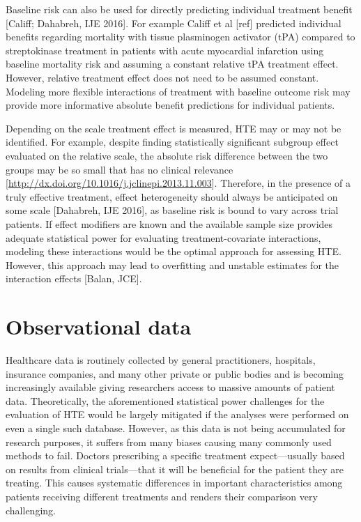 \documentclass[
]{book}
\begin{document}
Baseline risk can also be used for directly predicting individual treatment
benefit {[}Califf; Dahabreh, IJE 2016{]}. For example Califf et al {[}ref{]} predicted
individual benefits regarding mortality with tissue plasminogen activator (tPA)
compared to streptokinase treatment in patients with acute myocardial infarction
using baseline mortality risk and assuming a constant relative tPA treatment
effect. However, relative treatment effect does not need to be assumed
constant. Modeling more flexible interactions of treatment with baseline outcome
risk may provide more informative absolute benefit predictions for individual
patients.

Depending on the scale treatment effect is measured, HTE may or may not be
identified. For example, despite finding statistically significant subgroup
effect evaluated on the relative scale, the absolute risk difference between the
two groups may be so small that has no clinical relevance
{[}\url{http://dx.doi.org/10.1016/j.jclinepi.2013.11.003}{]}. Therefore, in the presence
of a truly effective treatment, effect heterogeneity should always be
anticipated on some scale {[}Dahabreh, IJE 2016{]}, as baseline risk is bound to
vary across trial patients. If effect modifiers are known and the available
sample size provides adequate statistical power for evaluating
treatment-covariate interactions, modeling these interactions would be the
optimal approach for assessing HTE. However, this approach may lead to
overfitting and unstable estimates for the interaction effects {[}Balan, JCE{]}.

\hypertarget{observational-data}{%
\section{Observational data}\label{observational-data}}

Healthcare data is routinely collected by general practitioners, hospitals,
insurance companies, and many other private or public bodies and is becoming
increasingly available giving researchers access to massive amounts of patient
data. Theoretically, the aforementioned statistical power challenges for the
evaluation of HTE would be largely mitigated if the analyses were performed on
even a single such database. However, as this data is not being accumulated for
research purposes, it suffers from many biases causing many commonly used
methods to fail. Doctors prescribing a specific treatment expect---usually based
on results from clinical trials---that it will be beneficial for the patient
they are treating. This causes systematic differences in important
characteristics among patients receiving different treatments and renders their
comparison very challenging.
\end{document}
